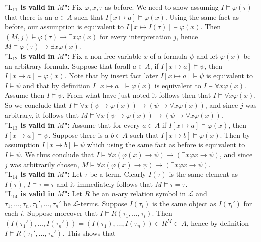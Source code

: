 \begin{proofsketch}
    \textbf{"$\mathrm{L}_{11}$ is valid in $M$":} Fix $\varphi,x,\tau$ as before. We need to show assuming $I \vDash \varphi(\tau)$ that there is an $a\in A $ such that $I[x\mapsto a]\vDash \varphi(x)$. Using the same fact as before, our assumption is equivalent to $I[x\mapsto I(\tau)] \vDash \varphi(x)$. Then $(M,j) \vDash \varphi(\tau)\to \exists x\varphi(x)$ for every interpretation $j$, hence $M\vDash \varphi(\tau)\to \exists x\varphi(x)$.\\
    \textbf{"$\mathrm{L}_{12}$ is valid in $M$":} Fix a non-free variable $x$ of a formula $\psi$ and let $\varphi(x)$ be an arbitrary formula. Suppose that forall $a\in A$, if $I[x\mapsto a]\vDash \psi$, then $I[x\mapsto a]\vDash \varphi(x)$. Note that by {\large insert fact later} $I[x\mapsto a]\vDash \psi$ is equivalent to $I\vDash \psi$ and that by definition $I[x\mapsto a]\vDash \varphi(x)$ is equivalent to $I\vDash \forall x\varphi(x)$. Assume then $I\vDash \psi$. From what have just noted it follows then that $I\vDash \forall x \varphi(x)$. So we conclude that $I \vDash \forall x(\psi \to \varphi(x))\to (\psi \to \forall x \varphi(x))$, and since $j$ was arbitrary, it follows that $M\vDash  \forall x(\psi \to \varphi(x))\to (\psi \to \forall x \varphi(x))$.\\
    \textbf{"$\mathrm{L}_{13}$ is valid in $M$":} Assume that for every $a\in A$ if $I[x\mapsto a] \vDash\varphi(x)$, then $I[x\mapsto a]\vDash \psi$. Suppose there is a $b\in A$ such that $I[x\mapsto b]\vDash \varphi(x)$. Then by assumption $I[x\mapsto b]\vDash \psi$ which using the same fact as before is equivalent to $I\vDash \psi$. We thus conclude that $I \vDash \forall x(\varphi(x)\to \psi) \to (\exists x \varphi x \to \psi)$, and since $j$ was arbitrarily chosen, $M\vDash\forall x(\varphi(x)\to \psi) \to (\exists x \varphi x \to \psi)$.\\
    \textbf{"$\mathrm{L}_{14}$ is valid in $M$":}
    Let $\tau$ be a term. Clearly $I(\tau)$ is the same element as $I(\tau)$, $I\vDash \tau = \tau$ and it immediately follows that $M\vDash \tau = \tau$.\\
    \textbf{"$\mathrm{L}_{14}$ is valid in $M$":} Let $R$ be an $n$-ary relation symbol in $\mathcal{L}$ and $\tau_1,\dots,\tau_n,\tau_1',\dots,\tau_n'$ be $\mathcal{L}$-terms. Suppose $I(\tau_i)$ is the same object as $I(\tau_i')$ for each $i$. Suppose moreover that $I\vDash R(\tau_1,\dots,\tau_i)$. Then $(I(\tau_1'),\dots, I(\tau_n'))=(I(\tau_1),\dots,I(\tau_n))\in R^M\subset A$, hence by definition $I \vDash R(\tau_1',\dots,\tau_n')$. This shows that 

\end{proofsketch}
